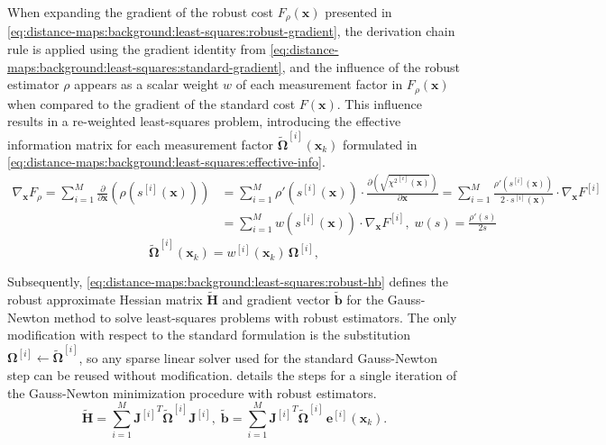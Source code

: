 When expanding the gradient of the robust cost
$F_{\rho}(\mathbf{x})$ presented in
\eqref{eq:distance-maps:background:least-squares:robust-gradient},
the derivation chain rule is applied using the gradient identity from
\eqref{eq:distance-maps:background:least-squares:standard-gradient},
and the influence of the robust estimator $\rho$ appears as a scalar weight $w$
of each measurement factor in $F_{\rho}(\mathbf{x})$ when compared to
the gradient of the standard cost $F(\mathbf{x})$.
This influence results in a re-weighted least-squares problem,
introducing the effective information matrix for each measurement factor
$\mathbf{\tilde{\Omega}}^{[i]}(\mathbf{x}_k)$ formulated in
\eqref{eq:distance-maps:background:least-squares:effective-info}.
\begin{equation}
\label{eq:distance-maps:background:least-squares:robust-gradient}
\begin{aligned}
\nabla_{\mathbf{x}} F_{\rho} =
\sum_{i=1}^{M}
\frac{\partial}{\partial \mathbf{x}}
\!\left(\rho\!\left(s^{[i]}(\mathbf{x})\right)\right)
& = \sum_{i=1}^{M}
    \rho'\!\left(s^{[i]}(\mathbf{x})\right)
    \cdot
    \frac{\partial \left(\sqrt{{\chi^2}^{[i]}(\mathbf{x})}\right)}{\partial \mathbf{x}}
  = \sum_{i=1}^{M}
    \frac{\rho'\!\left(s^{[i]}(\mathbf{x})\right)}{2 \cdot s^{[i]}(\mathbf{x})}
    \cdot
    \nabla_{\mathbf{x}} F^{[i]}\\
& = \sum_{i=1}^{M}
    w(s^{[i]}(\mathbf{x}))
    \cdot
    \nabla_{\mathbf{x}} F^{[i]}, \;
    w(s) = \frac{\rho'(s)}{2s}
\end{aligned}
\end{equation}
\begin{equation}
\label{eq:distance-maps:background:least-squares:effective-info}
\mathbf{\tilde{\Omega}}^{[i]}(\mathbf{x}_k)
= w^{[i]}(\mathbf{x}_k)\,\mathbf{\Omega}^{[i]},
\end{equation}

Subsequently,
\eqref{eq:distance-maps:background:least-squares:robust-hb}
defines the robust approximate Hessian matrix $\mathbf{\tilde{H}}$ and
gradient vector $\mathbf{\tilde{b}}$ for the Gauss-Newton
method to solve least-squares problems with robust estimators.
The only modification with respect to the standard formulation is the
substitution $\mathbf{\Omega}^{[i]} \leftarrow \mathbf{\tilde{\Omega}}^{[i]}$,
so any sparse linear solver used for the standard Gauss-Newton step can be
reused without modification.
 details
the steps for a single iteration of the Gauss-Newton minimization procedure
with robust estimators.
\begin{equation}
\label{eq:distance-maps:background:least-squares:robust-hb}
\mathbf{\tilde{H}}
= \sum_{i=1}^{M}
  {\mathbf{J}^{[i]}}^T
  \mathbf{\tilde{\Omega}}^{[i]}
  \mathbf{J}^{[i]},
\;
\mathbf{\tilde{b}}
= \sum_{i=1}^{M}
  {\mathbf{J}^{[i]}}^T
  \mathbf{\tilde{\Omega}}^{[i]}\,
  \mathbf{e}^{[i]}(\mathbf{x}_k).
\end{equation}

